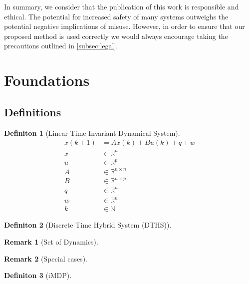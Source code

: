 \documentclass[twoside,twocolumn]{article}
\newtheorem{remark}{Remark}
\newtheorem{definition}{Definiton}
\begin{document}
In summary, we consider that the publication of this work is responsible and ethical. The potential for increased safety of many systems outweighs the potential negative implications of misuse. However, in order to ensure that our proposed method is used correctly we would always encourage taking the precautions outlined in \autoref{subsec:legal}.

\section{Foundations}

\subsection{Definitions}

\begin{definition}[Linear Time Invariant Dynamical System]
	\begin{equation}
		\begin{aligned}
			x(k+1)&=Ax(k)+Bu(k)+q+w\\
			x &\in \mathbb{R}^n\\
			u &\in \mathbb{R}^p\\
			A &\in \mathbb{R}^{n \times n}\\
			B &\in \mathbb{R}^{n \times p}\\
			q &\in \mathbb{R}^n\\
			w &\in \mathbb{R}^n\\
			k &\in \mathbb{N}
		\end{aligned}
	\end{equation}
\end{definition}

\begin{definition}[Discrete Time Hybrid System (DTHS)]

\end{definition}


\begin{remark}[Set of Dynamics]

\end{remark}

\begin{remark}[Special cases]

\end{remark}

\begin{definition}[iMDP]

\end{definition}
\end{document}
